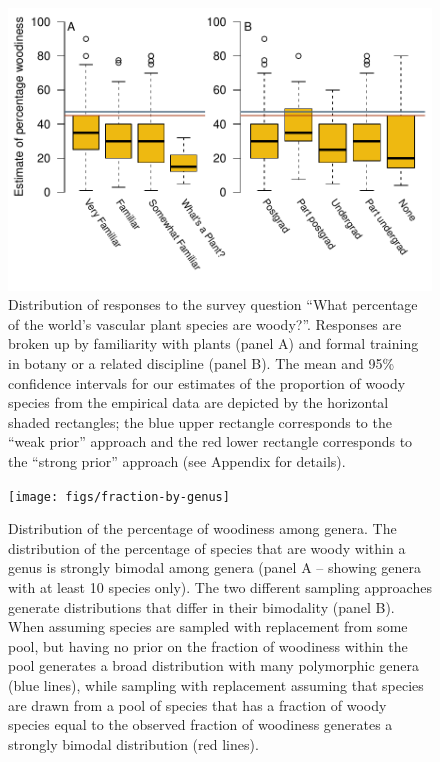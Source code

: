 \documentclass[a4paper,12pt]{article}
\begin{document}




\begin{figure}[p]
  \centering
  \includegraphics{figs/survey-results}
  \caption{Distribution of responses to the survey question ``What
    percentage of the world's vascular plant species are
    woody?''. Responses are broken up by familiarity with plants
    (panel A) and formal training in botany or a related discipline
    (panel B). The mean and 95\% confidence intervals for our
    estimates of the proportion of woody species from the empirical
    data are depicted by the horizontal shaded rectangles; the blue
    upper rectangle corresponds to the ``weak prior'' approach and the
    red lower rectangle corresponds to the ``strong prior'' approach
    (see Appendix for details).}
  \label{fig:survey}
\end{figure}

\begin{figure}[p]
  \centering
  \texttt{[image: figs/fraction-by-genus]}
  \caption{Distribution of the percentage of woodiness among genera.
    The distribution of the percentage of species that are woody within
    a genus is strongly bimodal among genera (panel A -- showing
    genera with at least 10 species only).
    The two different sampling approaches generate distributions that
    differ in their bimodality (panel B). When assuming species are
    sampled with replacement from some pool, but having no prior on
    the fraction of woodiness within the pool generates a broad
    distribution with many polymorphic genera (blue lines), while
    sampling with replacement assuming that species are drawn from a
    pool of species that has a fraction of woody species equal to the
    observed fraction of woodiness generates a strongly bimodal
    distribution (red lines).}
  \label{fig:distribution-genera}
\end{figure}
\end{document}
